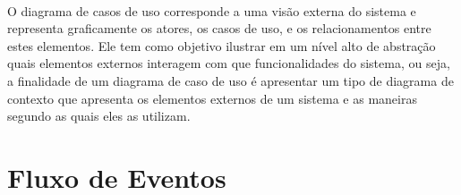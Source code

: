 \documentclass[12pt]{report}
\begin{document}
\\

  O diagrama de casos de uso corresponde a uma visão externa do sistema
  e representa graficamente os atores, os casos de uso, e os relacionamentos
  entre estes elementos. Ele tem como objetivo ilustrar em um nível alto de
  abstração quais elementos externos interagem com que funcionalidades do sistema,
  ou seja, a finalidade de um diagrama de caso de uso é apresentar um tipo de diagrama
  de contexto que apresenta os elementos externos de um sistema e as maneiras segundo
  as quais eles as utilizam.

\section{Fluxo de Eventos}
\end{document}

